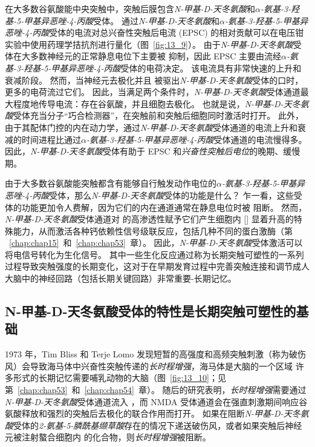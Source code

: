 在大多数谷氨酸能中央突触中，突触后膜包含\textit{N-甲基-D-天冬氨酸}和\textit{$\alpha$-氨基-3-羟基-5-甲基异恶唑-4-丙酸}受体。
通过\textit{N-甲基-D-天冬氨酸}和\textit{$\alpha$-氨基-3-羟基-5-甲基异恶唑-4-丙酸}受体的电流对总兴奋性突触后电流 (EPSC) 的相对贡献可以在电压钳实验中使用药理学拮抗剂进行量化（图~\ref{fig:13_9}）。
由于\textit{N-甲基-D-天冬氨酸}受体在大多数神经元的正常静息电位下主要被  抑制，因此 EPSC 主要由流经\textit{$\alpha$-氨基-3-羟基-5-甲基异恶唑-4-丙酸}受体的电荷决定。
该电流具有非常快速的上升和衰减阶段。
然而，当神经元去极化并且  被驱出\textit{N-甲基-D-天冬氨酸}受体的口时，更多的电荷流过它们。
因此，当满足两个条件时，\textit{N-甲基-D-天冬氨酸}受体通道最大程度地传导电流：存在谷氨酸，并且细胞去极化。
也就是说，\textit{N-甲基-D-天冬氨酸}受体充当分子“巧合检测器”，在突触前和突触后细胞同时激活时打开。
此外，由于其配体门控的内在动力学，通过\textit{N-甲基-D-天冬氨酸}受体通道的电流上升和衰减的时间进程比通过\textit{$\alpha$-氨基-3-羟基-5-甲基异恶唑-4-丙酸}受体通道的电流慢得多。
因此，\textit{N-甲基-D-天冬氨酸}受体有助于 EPSC 和\textit{兴奋性突触后电位}的晚期、缓慢期。


由于大多数谷氨酸能突触都含有能够自行触发动作电位的\textit{$\alpha$-氨基-3-羟基-5-甲基异恶唑-4-丙酸}受体，那么\textit{N-甲基-D-天冬氨酸}受体的功能是什么？
乍一看，这些受体的功能更加令人费解，因为它们的内在通道通常在静息电位时被  阻断。
然而，\textit{N-甲基-D-天冬氨酸}受体通道对  的高渗透性赋予它们产生细胞内 [] 显着升高的特殊能力，从而激活各种钙依赖性信号级联反应，包括几种不同的蛋白激酶（第 ~\ref{chap:chap15}~和~\ref{chap:chap53}~章）。
因此，\textit{N-甲基-D-天冬氨酸}受体激活可以将电信号转化为生化信号。
其中一些生化反应通过称为长期突触可塑性的一系列过程导致突触强度的长期变化，这对于在早期发育过程中完善突触连接和调节成人大脑中的神经回路（包括长期关键回路）非常重要-长期记忆。



\subsection{N-甲基-D-天冬氨酸受体的特性是长期突触可塑性的基础}

1973 年，Tim Bliss 和 Terje Lomo 发现短暂的高强度和高频突触刺激（称为破伤风）会导致海马体中兴奋性突触传递的\textit{长时程增强}，海马体是大脑的一个区域 许多形式的长期记忆需要哺乳动物的大脑（图~\ref{fig:13_10}；见第~\ref{chap:chap53}~和~\ref{chap:chap54}~章）。
随后的研究表明，\textit{长时程增强}需要通过\textit{N-甲基-D-天冬氨酸}受体通道流入 ，而 NMDA 受体通道会在强直刺激期间响应谷氨酸释放和强烈的突触后去极化的联合作用而打开。
如果在阻断\textit{N-甲基-D-天冬氨酸}受体的\textit{2-氨基-5-膦酰基缬草酸}存在的情况下递送破伤风，或者如果突触后神经元被注射螯合细胞内  的化合物，则\textit{长时程增强}被阻断。


